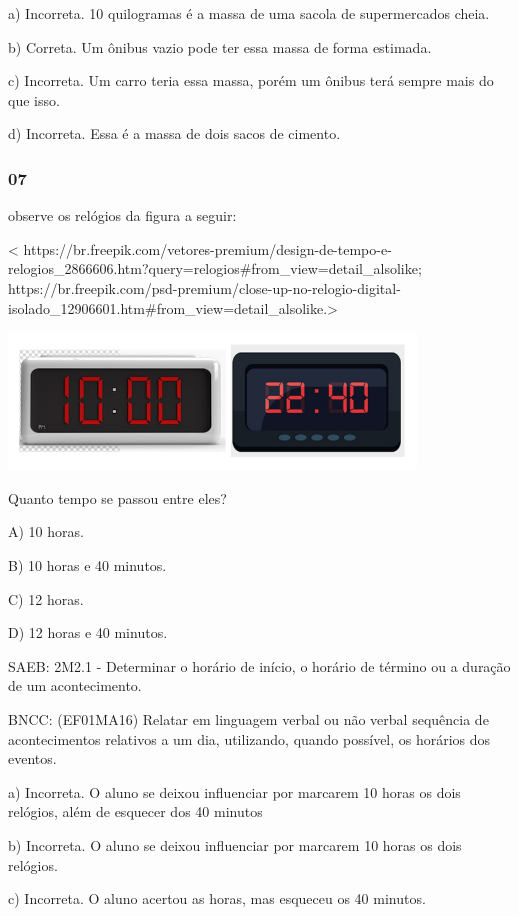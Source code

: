 \begin{itemize}
\begin{itemize}
a) Incorreta. 10 quilogramas é a massa de uma sacola de supermercados
cheia.

b) Correta. Um ônibus vazio pode ter essa massa de forma estimada.

c) Incorreta. Um carro teria essa massa, porém um ônibus terá sempre
mais do que isso.

d) Incorreta. Essa é a massa de dois sacos de cimento.

\subsubsection{07}\label{section-138}

observe os relógios da figura a seguir:

\textless{}
https://br.freepik.com/vetores-premium/design-de-tempo-e-relogios\_2866606.htm?query=relogios\#from\_view=detail\_alsolike;
https://br.freepik.com/psd-premium/close-up-no-relogio-digital-isolado\_12906601.htm\#from\_view=detail\_alsolike.\textgreater{}

\includegraphics[width=4.26398in,height=1.43904in]{media/image156.png}

Quanto tempo se passou entre eles?

A) 10 horas.

B) 10 horas e 40 minutos.

C) 12 horas.

D) 12 horas e 40 minutos.

SAEB: 2M2.1 - Determinar o horário de início, o horário de término ou a
duração de um acontecimento.

BNCC: (EF01MA16) Relatar em linguagem verbal ou não verbal sequência de
acontecimentos relativos a um dia, utilizando, quando possível, os
horários dos eventos.

a) Incorreta. O aluno se deixou influenciar por marcarem 10 horas os
dois relógios, além de esquecer dos 40 minutos

b) Incorreta. O aluno se deixou influenciar por marcarem 10 horas os
dois relógios.

c) Incorreta. O aluno acertou as horas, mas esqueceu os 40 minutos.


\end{itemize}
\end{itemize}
